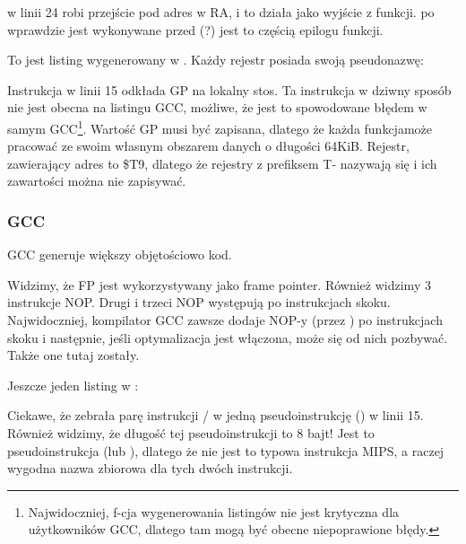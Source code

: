  w linii 24 robi przejście pod adres w \ac{RA}, i to działa jako wyjście z funkcji.
 po  wprawdzie jest wykonywane przed  (?) 
jest to częścią epilogu funkcji.

To jest listing wygenerowany w \IDA. Każdy rejestr posiada swoją pseudonazwę:



Instrukcja w linii 15 odkłada GP na lokalny stos. Ta instrukcja w dziwny sposób nie jest obecna na listingu GCC, możliwe, że jest to spowodowane błędem w samym GCC\footnote{Najwidoczniej, f-cja wygenerowania listingów nie jest krytyczna
dla użytkowników GCC, dlatego tam mogą być obecne niepoprawione błędy.}.
Wartość GP musi być zapisana, dlatego że każda funkcjamoże pracować ze swoim własnym obszarem danych o długości 64KiB.
Rejestr, zawierający adres \puts to \$T9, dlatego że rejestry z prefiksem T- nazywają się
 i ich zawartości można nie zapisywać.

\subsubsection{\NonOptimizing GCC}

\NonOptimizing GCC generuje większy objętościowo kod.



Widzimy, że FP jest wykorzystywany jako frame pointer.
Również widzimy 3 instrukcje \ac{NOP}.
Drugi i trzeci \ac{NOP} występują po instrukcjach skoku.
Najwidoczniej, kompilator GCC zawsze dodaje \ac{NOP}-y (przez )
po instrukcjach skoku i następnie, jeśli optymalizacja jest włączona, może się od nich pozbywać.
Także one tutaj zostały.

Jeszcze jeden listing w \IDA:



Ciekawe, że \IDA zebrała parę instrukcji / w jedną pseudoinstrukcję 
 () w linii 15.
Również widzimy, że długość tej pseudoinstrukcji to 8 bajt!
Jest to pseudoinstrukcja (lub ), dlatego że nie jest to typowa instrukcja MIPS, a raczej wygodna nazwa zbiorowa dla tych dwóch instrukcji.

